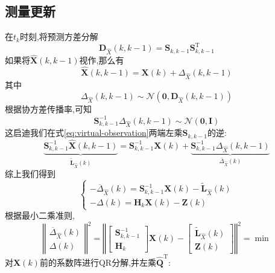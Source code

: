 \documentclass[cn,10pt,citestyle=gb7714-2015,bibstyle=gb7714-2015]{elegantbook}
\newcommand{\mT}{\mathrm{T}}
\begin{document}
\subsection{测量更新}
在$t_k$时刻,将预测方差分解
\begin{equation}
  \bm{D}_{\hat{X}}(k,k-1)=\bm{S}_{k,k-1}\bm{S}_{k,k-1}^\mT
\end{equation}
如果将$\hat{\bm{X}}(k,k-1)$视作,那么有
\begin{equation}\label{eq:virtual-observation}
  \hat{\bm{X}}(k,k-1)=\bm{X}(k)+\bm{\varDelta}_{\hat{X}}(k,k-1)
\end{equation}
其中
\[
  \bm{\varDelta}_{\hat{X}}(k,k-1)\sim\mathcal{N}(\bm{0},\bm{D}_{\hat{X}}(k,k-1))
\]
根据协方差传播率,可知
\[
  \bm{S}_{k,k-1}^{-1}\bm{\varDelta}_{\hat{X}}(k,k-1)\sim\mathcal{N}(\bm{0},\bm{I})
\]
这启迪我们在式\eqref{eq:virtual-observation}两端左乘$\bm{S}_{k,k-1}$的逆:
\begin{equation}
  \underbrace{\bm{S}_{k,k-1}^{-1}\hat{\bm{X}}(k,k-1)}_{\widetilde{\bm{L}}_{\hat{X}}(k)}=\bm{S}_{k,k-1}^{-1}\bm{X}(k)+\underbrace{\bm{S}_{k,k-1}^{-1}\bm{\varDelta}_{\hat{X}}(k,k-1)}_{\overline{\bm{\varDelta}}_{\hat{X}}(k)}
\end{equation}
综上我们得到
\[
\begin{cases}
  -\overline{\bm{\varDelta}}_{\hat{X}}(k)=\bm{S}_{k,k-1}^{-1}\bm{X}(k)-\widetilde{\bm{L}}_{\hat{X}}(k)\\
  -\bm{\varDelta}(k)=\bm{H}_k\bm{X}(k)-\bm{Z}(k)
\end{cases}
\]
根据最小二乘准则,
\begin{equation}
  \left\Vert\begin{matrix}
    \overline{\bm{\varDelta}}_{\hat{X}}(k)\\
    \bm{\varDelta}(k)
  \end{matrix}\right\Vert^2=
  \left\Vert\begin{bmatrix}
    \bm{S}_{k,k-1}^{-1}\\
    \bm{H}_k
  \end{bmatrix}\bm{X}(k)-\begin{bmatrix}
    \widetilde{\bm{L}}_{\hat{X}}(k)\\
    \bm{Z}(k)
  \end{bmatrix}\right\Vert^2=\min
\end{equation}
对$\bm{X}(k)$前的系数阵进行QR分解,并左乘$\hat{\bm{Q}}^\mT$:
\end{document}
